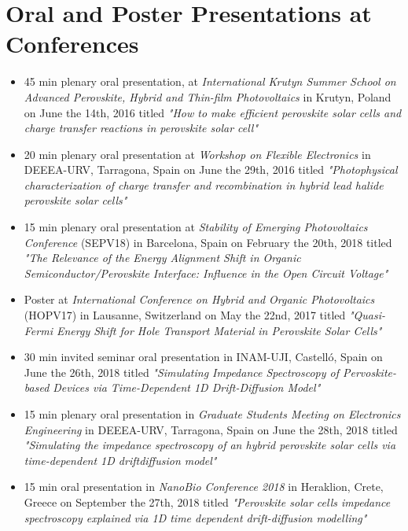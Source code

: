 \documentclass[b5paper, 12pt, openright]{book} %
\begin{document}
{\chapter{Oral and Poster Presentations at Conferences}
\begin{itemize}
	\item 45 min plenary oral presentation, at \textit{International Krutyn Summer School on Advanced Perovskite, Hybrid and Thin-film Photovoltaics} in Krutyn, Poland on June the 14th, 2016 titled \textit{"How to make efficient perovskite solar cells and charge transfer reactions in perovskite solar cell"}
	\item 20 min plenary oral presentation at \textit{Workshop on Flexible Electronics} in DEEEA-URV, Tarragona, Spain on June the 29th, 2016 titled \textit{"Photophysical characterization of charge transfer and recombination in hybrid lead halide perovskite solar cells"}
	\item 15 min plenary oral presentation at \textit{Stability of Emerging Photovoltaics Conference} (SEPV18) in Barcelona, Spain on February the 20th, 2018 titled \textit{"The Relevance of the Energy Alignment Shift in Organic Semiconductor/Perovskite Interface: Influence in the Open Circuit Voltage"}
	\item Poster at \textit{International Conference on Hybrid and Organic Photovoltaics} (HOPV17) in Lausanne, Switzerland on May the 22nd, 2017 titled \textit{"Quasi-Fermi Energy Shift for Hole Transport Material in Perovskite Solar Cells"}
	\item 30 min invited seminar oral presentation in INAM-UJI, Castelló, Spain on June the 26th, 2018 titled \textit{"Simulating Impedance Spectroscopy of Pervoskite-based Devices via Time-Dependent 1D Drift-Diffusion Model"}
	\item 15 min plenary oral presentation in \textit{Graduate Students Meeting on Electronics Engineering} in DEEEA-URV, Tarragona, Spain on June the 28th, 2018 titled \textit{"Simulating the impedance spectroscopy of an hybrid perovskite solar cells via time-dependent 1D driftdiffusion model"}
	\item 15 min oral presentation in \textit{NanoBio Conference 2018} in Heraklion, Crete, Greece on September the 27th, 2018 titled \textit{"Perovskite solar cells impedance spectroscopy explained via 1D time dependent drift-diffusion modelling"}
\end{itemize}



	}%
\end{document}
